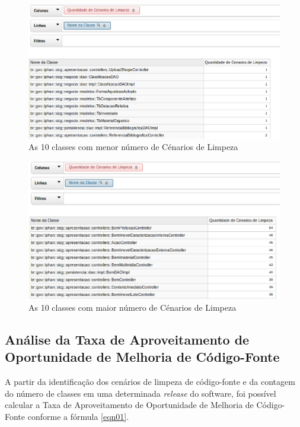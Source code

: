 \begin{figure}[ht!]
\centering
\includegraphics[keepaspectratio=true,scale=0.6]{figuras/10-worst.eps}
\caption{As 10 classes com menor número de Cénarios de Limpeza}
\label{fig:best-10-cenarios}
\end{figure}
\FloatBarrier

\begin{figure}[ht!]
\centering
\includegraphics[keepaspectratio=true,scale=0.6]{figuras/10-best.eps}
\caption{As 10 classes com maior número de Cénarios de Limpeza}
\label{fig:worst-10-cenarios}
\end{figure}
\FloatBarrier


\subsection{Análise da Taxa de Aproveitamento de Oportunidade de Melhoria de Código-Fonte}

A partir da identificação dos cenários de limpeza de código-fonte e da contagem do número de classes em uma determinada \textit{release} do software, foi possível calcular a Taxa de Aproveitamento de Oportunidade de Melhoria de Código-Fonte conforme a fórmula \ref{eqn01}.

